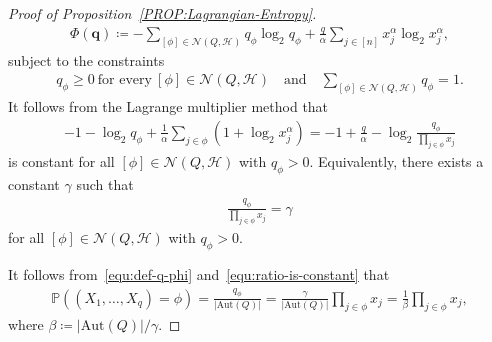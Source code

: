 \documentclass[10pt,a4paper]{amsart}
\begin{document}
\begin{proof}[Proof of Proposition~\ref{PROP:Lagrangian-Entropy}]
    \begin{align*}
        \Phi(\mathbf{q})
        \coloneqq 
        - \sum_{[\phi] \in \mathcal{N}(Q,\mathcal{H})} q_{\phi} \log_{2} q_{\phi} + \frac{q}{\alpha} \sum_{j \in [n]} x_{j}^{\alpha} \log_{2} x_{j}^{\alpha}, 
    \end{align*}
    subject to the constraints 
    \begin{align*}
        q_{\phi} \ge 0 ~\text{for every}~ [\phi] \in \mathcal{N}(Q,\mathcal{H})
        \quad\text{and}\quad 
        \sum_{[\phi] \in \mathcal{N}(Q,\mathcal{H})} q_{\phi} = 1. 
    \end{align*}
    It follows from the Lagrange multiplier method that 
    \begin{align*}
        -1 - \log_{2} q_{\phi} + \frac{1}{\alpha} \sum_{j \in \phi} \left(1+\log_{2} x_j^{\alpha}\right) 
        = -1+\frac{q}{\alpha} - \log_{2} \frac{q_{\phi}}{\prod_{j\in \phi} x_j}
    \end{align*}
    is constant for all $[\phi] \in \mathcal{N}(Q,\mathcal{H})$ with $q_{\phi} > 0$. 
    Equivalently, there exists a constant $\gamma$ such that 
    \begin{align}\label{equ:ratio-is-constant}
        \frac{q_{\phi}}{\prod_{j \in \phi} x_j} = \gamma
    \end{align}
    for all $[\phi] \in \mathcal{N}(Q,\mathcal{H})$ with $q_{\phi} > 0$.

    It follows from~\eqref{equ:def-q-phi} and~\eqref{equ:ratio-is-constant} that 
    \begin{align}\label{equ:p-phi}
        \mathbb{P}\left((X_1, \ldots, X_q) = \phi \right)
        = \frac{q_{\phi}}{|\mathrm{Aut}(Q)|}
        = \frac{\gamma}{|\mathrm{Aut}(Q)|}  \prod_{j \in \phi} x_j
        = \frac{1}{\beta} \prod_{j \in \phi} x_j,  
    \end{align}
    where $\beta \coloneqq |\mathrm{Aut}(Q)|/\gamma$. 
    

\end{proof}
\end{document}
